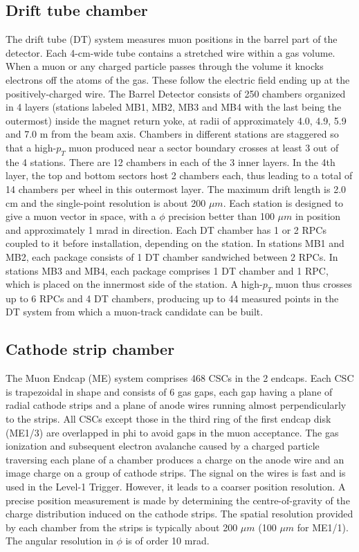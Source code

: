 \subsection*{Drift tube chamber}
The drift tube (DT) system measures muon positions in the barrel part of the detector. Each 4-cm-wide tube contains a stretched wire within a gas volume. When a muon or any charged particle passes through the volume it knocks electrons off the atoms of the gas. These follow the electric field ending up at the positively-charged wire.
The Barrel Detector consists of 250 chambers organized in 4 layers (stations labeled MB1, MB2, MB3 and MB4 with the
last being the outermost) inside the magnet return yoke, at radii of approximately 4.0, 4.9, 5.9 and 7.0 m from the beam axis.
Chambers in different stations are staggered so that a high-$p_{T}$ muon produced near a sector boundary crosses at least 3 out of
the 4 stations. There are 12 chambers in each of the 3 inner layers. In the 4th layer, the top
and bottom sectors host 2 chambers each, thus leading to a total of 14 chambers per wheel
in this outermost layer. The maximum drift length is 2.0 cm and the single-point resolution is about 200 $\mu m$. Each station is designed to give a muon vector in space, with a
$\phi$ precision better than 100 $\mu m$ in position and approximately 1 mrad in direction.
\newline Each DT chamber has 1 or 2 RPCs coupled to it before installation, depending on the station.
In stations MB1 and MB2, each package consists of 1 DT chamber sandwiched between 2
RPCs. In stations MB3 and MB4, each package comprises 1 DT chamber and 1 RPC, which
is placed on the innermost side of the station. A high-$p_{T}$ muon thus crosses up to 6 RPCs
and 4 DT chambers, producing up to 44 measured points in the DT system from which a
muon-track candidate can be built.

\subsection*{Cathode strip chamber}
The Muon Endcap (ME) system comprises 468 CSCs in the 2 endcaps.
Each CSC is trapezoidal in shape and consists of 6 gas
gaps, each gap having a plane of radial cathode strips and a plane of anode wires running
almost perpendicularly to the strips. All CSCs except those in the third ring of the first endcap disk (ME1/3) are overlapped in phi to avoid gaps in the muon acceptance. The gas ionization
and subsequent electron avalanche caused by a charged particle traversing each plane of a
chamber produces a charge on the anode wire and an image charge on a group of cathode
strips. The signal on the wires is fast and is used in the Level-1 Trigger. However, it leads to
a coarser position resolution. A precise position measurement is made by determining the
centre-of-gravity of the charge distribution induced on the cathode strips. The spatial resolution provided by each chamber
from the strips is typically about 200 $\mu m$ (100 $\mu m$ for ME1/1). The angular resolution in $\phi$ is
of order 10 mrad.

